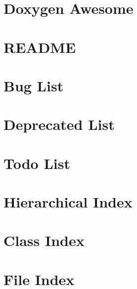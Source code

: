 \documentclass[twoside]{book}
\newcommand{\+}{\discretionary{\mbox{\scriptsize$\hookleftarrow$}}{}{}}
\begin{document}
\chapter{Doxygen Awesome}
\label{md__c___users_juanh__one_drive__escritorio__sistemas__embebidos__proyecto_final__l_a_l__control_67993a74b1134a947180b41ee9c37ce9}

\chapter{README}
\label{md__c___users_juanh__one_drive__escritorio__sistemas__embebidos__proyecto_final__l_a_l__control__mbed_o_s__r_e_a_d_m_e}

\chapter{Bug List}
\label{bug}

\chapter{Deprecated List}
\label{deprecated}

\chapter{Todo List}
\label{todo}

\chapter{Hierarchical Index}

\chapter{Class Index}

\chapter{File Index}

\end{document}
